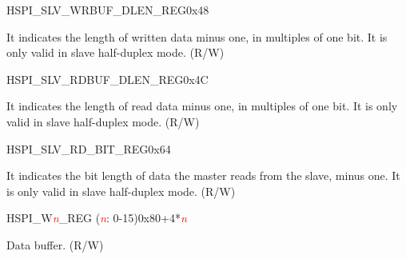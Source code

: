 \begin{register}{H}{SPI\_SLV\_WRBUF\_DLEN\_REG}{0x48}\label{regdesc:SPISLVWRBUFDLENREG}
%
%
\regnewline%
\begin{regdesc}\begin{reglist}
\item [SPI\_SLV\_WRBUF\_DBITLEN] It indicates the length of written data minus one, in multiples of one bit. It is only valid in slave half-duplex mode. (R/W)
\end{reglist}\end{regdesc}
\end{register}


\begin{register}{H}{SPI\_SLV\_RDBUF\_DLEN\_REG}{0x4C}\label{regdesc:SPISLVRDBUFDLENREG}
%
%
\regnewline%
\begin{regdesc}\begin{reglist}
\item [SPI\_SLV\_RDBUF\_DBITLEN]It indicates the length of read data minus one, in multiples of one bit. It is only valid in slave half-duplex mode. (R/W)
\end{reglist}\end{regdesc}
\end{register}


\begin{register}{H}{SPI\_SLV\_RD\_BIT\_REG}{0x64}\label{regdesc:SPISLVRDBITREG}
%
%
\regnewline%
\begin{regdesc}\begin{reglist}
\item [SPI\_SLV\_RDATA\_BIT]It indicates the bit length of data the master reads from the slave, minus one. It is only valid in slave half-duplex mode. (R/W)
\end{reglist}\end{regdesc}
\end{register}


\begin{register}{H}{SPI\_W\textcolor{red}{\it{n}}\_REG (\textcolor{red}{\it{n}}: 0-15)}{0x80+4*\textcolor{red}{\it{n}}}\label{regdesc:SPIWnREG}
%
\regnewline%
\begin{regdesc}\begin{reglist}
\item [SPI\_W\textcolor{red}{\it{n}}\_REG]Data buffer. (R/W)
\end{reglist}\end{regdesc}
\end{register}


